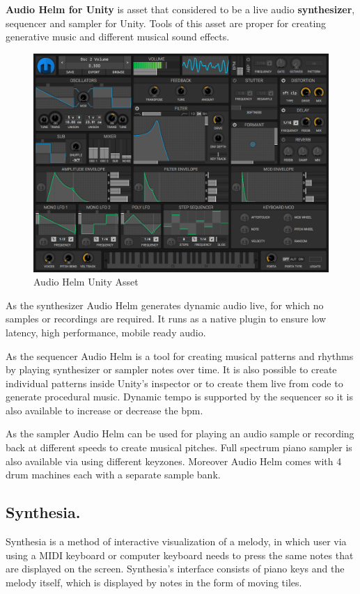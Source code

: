 \documentclass[thesis=B,english]{FITthesis}[2019/12/23]
\begin{document}
\textbf{Audio Helm for Unity} is asset that considered to be a live audio \textbf{synthesizer}, sequencer and sampler for Unity. Tools of this asset are proper for creating generative music and different musical sound effects.

\begin{figure}[ht]
            \includegraphics[width=\textwidth]{helm.png}
            \caption{Audio Helm Unity Asset}
            \label{fig:Unity Audio Helm}
\end{figure}

As the synthesizer Audio Helm generates dynamic audio live, for which no samples or recordings are required. It runs as a native plugin to ensure low latency, high performance, mobile ready audio. 

As the sequencer Audio Helm is a tool for creating musical patterns and rhythms by playing synthesizer or sampler notes over time. It is also possible to create individual patterns inside Unity's inspector or to create them live from code to generate procedural music. Dynamic tempo is supported by the sequencer so it is also available to increase or decrease the bpm.

As the sampler Audio Helm can be used for playing an audio sample or recording back at different speeds to create musical pitches. Full spectrum piano sampler is also available via using different keyzones. Moreover Audio Helm comes with 4 drum machines each with a separate sample bank.


\subsection{Synthesia.}
Synthesia is a method of interactive visualization of a melody, in which user via using a MIDI keyboard or computer keyboard needs to press the same notes that are displayed on the screen. Synthesia's interface consists of piano keys and the melody itself, which is displayed by notes in the form of moving tiles.
\end{document}
